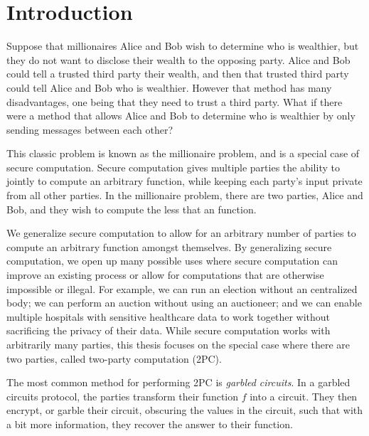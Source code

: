

\chapter*{Introduction}

Suppose that millionaires Alice and Bob wish to determine who is wealthier, but they do not want to disclose their wealth to the opposing party.
Alice and Bob could tell a trusted third party their wealth, and then that trusted third party could tell Alice and Bob who is wealthier.
However that method has many disadvantages, one being that they need to trust a third party.
What if there were a method that allows Alice and Bob to determine who is wealthier by only sending messages between each other?

This classic problem is known as the millionaire problem, and is a special case of secure computation.
Secure computation gives multiple parties the ability to jointly to compute an arbitrary function, while keeping each party's input private from all other parties.
In the millionaire problem, there are two parties, Alice and Bob, and they wish to compute the less that an function.

We generalize secure computation to allow for an arbitrary number of parties to compute an arbitrary function amongst themselves. 
By generalizing secure computation, we open up many possible uses where secure computation can improve an existing process or allow for computations that are otherwise impossible or illegal. 
For example, we can run an election without an centralized body; we can perform an auction without using an auctioneer; and we can enable multiple hospitals with sensitive healthcare data to work together without sacrificing the privacy of their data.
While secure computation works with arbitrarily many parties, this thesis focuses on the special case where there are two parties, called two-party computation (2PC).

The most common method for performing 2PC is \textit{garbled circuits}.
In a garbled circuits protocol, the parties transform their function $f$ into a circuit. 
They then encrypt, or garble their circuit, obscuring the values in the circuit, such that with a bit more information, they recover the answer to their function.

